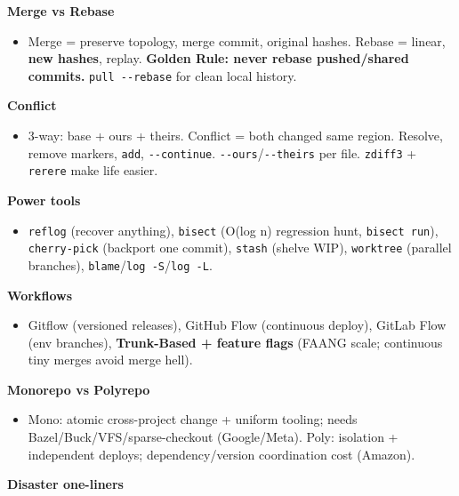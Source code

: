 \documentclass[11pt]{article}
\providecommand{\tightlist}{\setlength{\itemsep}{1pt}\setlength{\parskip}{0pt}}
\begin{document}
\textbf{Merge vs Rebase}

\begin{itemize}
\tightlist
\item
  Merge = preserve topology, merge commit, original hashes. Rebase = linear, \textbf{new hashes}, replay. \textbf{Golden Rule: never rebase pushed/shared commits.} \texttt{pull\ -\/-rebase} for clean local history.
\end{itemize}

\textbf{Conflict}

\begin{itemize}
\tightlist
\item
  3-way: base + ours + theirs. Conflict = both changed same region. Resolve, remove markers, \texttt{add}, \texttt{-\/-continue}. \texttt{-\/-ours}/\texttt{-\/-theirs} per file. \texttt{zdiff3} + \texttt{rerere} make life easier.
\end{itemize}

\textbf{Power tools}

\begin{itemize}
\tightlist
\item
  \texttt{reflog} (recover anything), \texttt{bisect} (O(log n) regression hunt, \texttt{bisect\ run}), \texttt{cherry-pick} (backport one commit), \texttt{stash} (shelve WIP), \texttt{worktree} (parallel branches), \texttt{blame}/\texttt{log\ -S}/\texttt{log\ -L}.
\end{itemize}

\textbf{Workflows}

\begin{itemize}
\tightlist
\item
  Gitflow (versioned releases), GitHub Flow (continuous deploy), GitLab Flow (env branches), \textbf{Trunk-Based + feature flags} (FAANG scale; continuous tiny merges avoid merge hell).
\end{itemize}

\textbf{Monorepo vs Polyrepo}

\begin{itemize}
\tightlist
\item
  Mono: atomic cross-project change + uniform tooling; needs Bazel/Buck/VFS/sparse-checkout (Google/Meta). Poly: isolation + independent deploys; dependency/version coordination cost (Amazon).
\end{itemize}

\textbf{Disaster one-liners}
\end{document}
